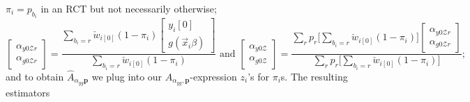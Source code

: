 \documentclass{article}
\newcommand{\owt}[1][{[z_{i}]}]{\ensuremath{\check{w}_{i#1}}}
\begin{document}
  $\pi_{i} = p_{b_{i}}$ in an RCT but not necessarily otherwise;
  \begin{equation*}
        \begin{bmatrix} \alpha_{y0\mathcal{Z}r}\\ \alpha_{g0\mathcal{Z}r}  \end{bmatrix}=
  \frac{\sum_{b_{i} =r}\owt[{[0]}](1-\pi_{i})\begin{bmatrix}y_{i}[0]\\
    g(\vec{x}_{i}\beta)\end{bmatrix}}{\sum_{b_{i}=r}\owt[{[0]}](1-\pi_{i})}
  \text{ and }
  \begin{bmatrix} \alpha_{y0\mathcal{Z}}\\ \alpha_{g0\mathcal{Z}}  \end{bmatrix} = \frac{\sum_{r}p_{r}\big[\sum_{b_{i}=r}\owt[{[0]}](1-\pi_{i})\big]
    \begin{bmatrix} \alpha_{y0\mathcal{Z}r}\\ \alpha_{g0\mathcal{Z}r}\end{bmatrix}}{\sum_{r}p_{r}\big[\sum_{b_{i}=r}\owt[{[0]}](1-\pi_{i})\big]};
  \end{equation*}
  and to obtain $\hat{A}_{\alpha_{yg}\mathbf{p}}$ we plug into our
  ${A}_{\alpha_{yg},\mathbf{p}}$-expression $z_{i}$'s for
  $\pi_{i}$s. The resulting estimators
\end{document}
